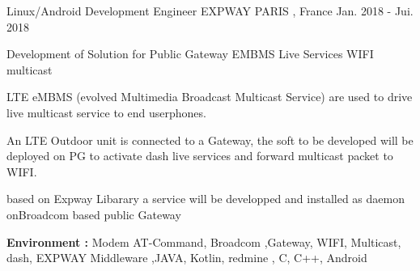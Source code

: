 \documentclass[11pt, a4paper]{awesome-cv} %
\begin{document}
\begin{cventries}
    \cventry
    {Linux/Android Development Engineer } %
    {EXPWAY} %
    {PARIS , France} %
    {Jan. 2018 - Jui. 2018} %
    { %
        \begin{cvitems}
            \item {Development of Solution for Public Gateway EMBMS Live Services WIFI multicast}
            \item {LTE eMBMS (evolved Multimedia Broadcast Multicast Service) are used to drive live multicast service to end userphones.}
            \item { An LTE  Outdoor unit is connected to a Gateway, the soft to be developed will be deployed on PG to activate dash live services and forward multicast packet to WIFI.}
            \item {based on Expway Libarary a service will be developped and installed as daemon onBroadcom based public Gateway}
            \item { \textbf{Environment :} Modem AT-Command, Broadcom ,Gateway, WIFI, Multicast, dash, EXPWAY Middleware ,JAVA, Kotlin, redmine , C, C++, Android}
        \end{cvitems}
    }




\end{cventries}
\end{document}
